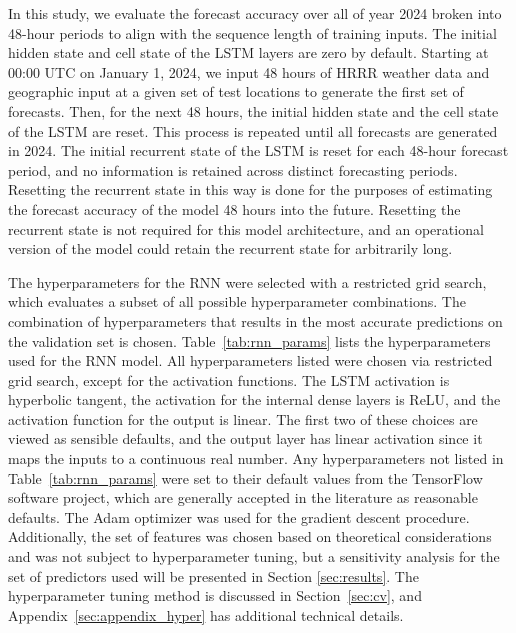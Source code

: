\documentclass[fire,article,submit,pdftex,moreauthors]{Definitions/mdpi}
\begin{document}
In this study, we evaluate the forecast accuracy over all of year 2024 broken into 48-hour periods to align with the sequence length of training inputs. The initial hidden state and cell state of the LSTM layers are zero by default. Starting at 00:00 UTC on January 1, 2024, we input 48 hours of HRRR weather data and geographic input at a given set of test locations to generate the first set of forecasts. Then, for the next 48 hours, the initial hidden state and the cell state of the LSTM are reset. This process is repeated until all forecasts are generated in 2024. The initial recurrent state of the LSTM is reset for each 48-hour forecast period, and no information is retained across distinct forecasting periods. Resetting the recurrent state in this way is done for the purposes of estimating the forecast accuracy of the model 48 hours into the future. Resetting the recurrent state is not required for this model architecture, and an operational version of the model could retain the recurrent state for arbitrarily long.

The hyperparameters for the RNN were selected with a restricted grid search, which evaluates a subset of all possible hyperparameter combinations. The combination of hyperparameters that results in the most accurate predictions on the validation set is chosen. Table~\ref{tab:rnn_params} lists the hyperparameters used for the RNN model. All hyperparameters listed were chosen via restricted grid search, except for the activation functions. The LSTM activation is hyperbolic tangent, the activation for the internal dense layers is ReLU, and the activation function for the output is linear. The first two of these choices are viewed as sensible defaults, and the output layer has linear activation since it maps the inputs to a continuous real number. Any hyperparameters not listed in Table~\ref{tab:rnn_params} were set to their default values from the TensorFlow software project, which are generally accepted in the literature as reasonable defaults. The Adam optimizer was used for the gradient descent procedure. Additionally, the set of features was chosen based on theoretical considerations and was not subject to hyperparameter tuning, but a sensitivity analysis for the set of predictors used will be presented in Section \ref{sec:results}. The hyperparameter tuning method is discussed in Section~\ref{sec:cv}, and Appendix~\ref{sec:appendix_hyper} has additional technical details.
\end{document}
